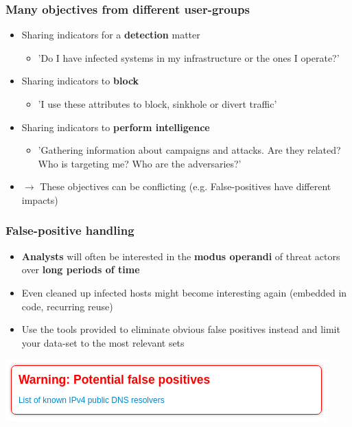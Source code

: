 \begin{frame}
	\frametitle{Many objectives from different user-groups}
    \begin{itemize}
        \item Sharing indicators for a \textbf{detection} matter
        \begin{itemize}
            \item 'Do I have infected systems in my infrastructure or the ones I operate?'
        \end{itemize}
        \item Sharing indicators to \textbf{block}
        \begin{itemize}
            \item 'I use these attributes to block, sinkhole or divert traffic'
		\end{itemize}
		\item Sharing indicators to \textbf{perform intelligence}
		\begin{itemize}
			\item 'Gathering information about campaigns and attacks. Are they related? Who is targeting me? Who are the adversaries?'
		\end{itemize}
		\item $\rightarrow$ These objectives can be conflicting (e.g. False-positives have different impacts)
	\end{itemize}
\end{frame}

\begin{frame}
\frametitle{False-positive handling}
\begin{itemize}
    \item \textbf{Analysts} will often be interested in the \textbf{modus operandi} of threat actors over \textbf{long periods of time}
	\item Even cleaned up infected hosts might become interesting again (embedded in code, recurring reuse)
	\item Use the tools provided to eliminate obvious false positives instead and limit your data-set to the most relevant sets
\end{itemize}
\centering\includegraphics[scale=0.8]{../images/false-positive.png}
\end{frame}

